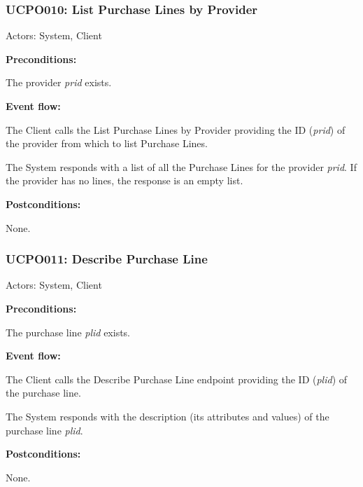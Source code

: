\begin{ucbox}{\subsubsection{UCPO010: List Purchase Lines by Provider}}
\label{UCPO010}

Actors: System, Client

\textbf{Preconditions:}

\ucitem The provider \textit{prid} exists.

\textbf{Event flow:}

\ucitem The Client calls the List Purchase Lines by Provider providing the ID (\textit{prid}) of the provider from which to list Purchase Lines.

\ucitem The System responds with a list of all the Purchase Lines for the provider \textit{prid}. If the provider has no lines, the response is an empty list.

\textbf{Postconditions:}

\ucitem None.

\end{ucbox}

\begin{ucbox}{\subsubsection{UCPO011: Describe Purchase Line}}
\label{UCPO011}

Actors: System, Client

\textbf{Preconditions:}

\ucitem The purchase line \textit{plid} exists.

\textbf{Event flow:}

\ucitem The Client calls the Describe Purchase Line endpoint providing the ID (\textit{plid}) of the purchase line.

\ucitem The System responds with the description (its attributes and values) of the purchase line \textit{plid}.

\textbf{Postconditions:}

\ucitem None.

\end{ucbox}

